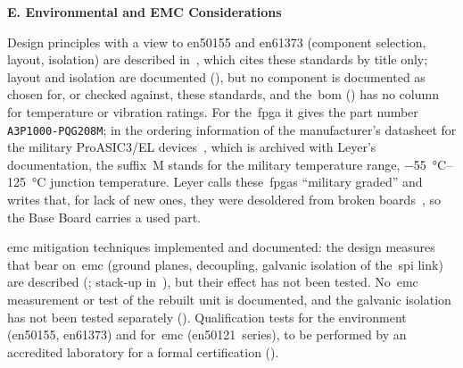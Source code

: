 \medskip
\noindent\textbf{E. Environmental and EMC Considerations}
\begin{checklist}
	 {\setlength{\emergencystretch}{1em}Design principles with a view to \gls{en50155} and \gls{en61373} (component selection, layout, isolation) are described in~, which cites these standards by title only; layout and isolation are documented (), but no component is documented as chosen for, or checked against, these standards, and the~\gls{bom} () has no column for temperature or vibration ratings. For the~\gls{fpga} it gives the part number \texttt{A3P1000-PQG208M}; in the ordering information of the manufacturer's datasheet for the military ProASIC3/EL devices~\cite[Fig.~67]{microsemi_ds0106}, which is archived with Leyer's documentation, the suffix~M stands for the military temperature range, \SIrange{-55}{125}{\celsius} junction temperature. Leyer calls these~\glspl{fpga} \enquote{military graded} and writes that, for lack of new ones, they were desoldered from broken boards~\cite[Sec.~6.2]{leyer2023}, so the Base Board carries a used part.\par}
	 \gls{emc} mitigation techniques implemented and documented: the design measures that bear on~\gls{emc} (ground planes, decoupling, galvanic isolation of the~\gls{spi} link) are described (; stack-up in~), but their effect has not been tested. No~\gls{emc} measurement or test of the rebuilt unit is documented, and the galvanic isolation has not been tested separately ().
	 Qualification tests for the environment (\gls{en50155}, \gls{en61373}) and for~\gls{emc} (\gls{en50121}~series), to be performed by an accredited laboratory for a formal certification ().
\end{checklist}

